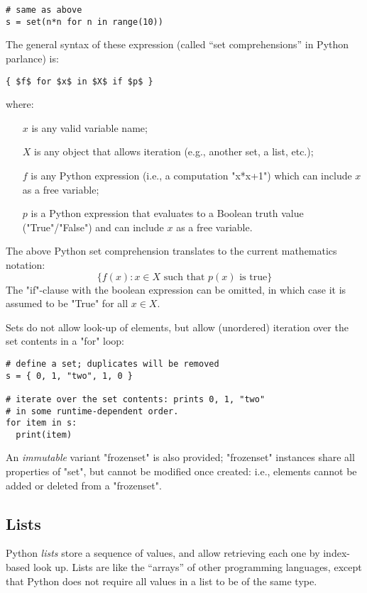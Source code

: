 {\begin{lstlisting}
# same as above
s = set(n*n for n in range(10))
\end{lstlisting}
The general syntax of these expression (called ``set comprehensions''
in Python parlance) is:
\begin{lstlisting}
{ $f$ for $x$ in $X$ if $p$ }
\end{lstlisting}
where:
\begin{itemize}
\item[$x$] is any valid variable name;
\item[$X$] is any object that allows iteration (e.g., another
  set, a list, etc.);
\item[$f$] is any Python expression (i.e., a computation "x*x+1") 
  which can include $x$ as a free variable;
\item[$p$] is a Python expression that evaluates to a Boolean truth
  value ("True"/"False") and can include $x$ as a free variable.
\end{itemize}
The above Python set comprehension translates to the current
mathematics notation:
\begin{equation*}
  \{ f(x) : x \in X \text{ such that } p(x) \text{ is true} \}
\end{equation*}
The "if"-clause with the boolean expression can be omitted, in which
case it is assumed to be "True" for all $x \in X$.

Sets do not allow look-up of elements, but allow (unordered) iteration
over the set contents in a "for" loop:
\begin{lstlisting}
# define a set; duplicates will be removed
s = { 0, 1, "two", 1, 0 }

# iterate over the set contents: prints 0, 1, "two" 
# in some runtime-dependent order.
for item in s:
  print(item)
\end{lstlisting}

An \emph{immutable} variant "frozenset" is also provided;
"frozenset" instances share all properties of "set", but cannot be
modified once created: i.e., elements cannot be added or deleted from
a "frozenset".

                                                               
\subsection{Lists}
\label{sec:lists}

Python \emph{lists} store a sequence of values, and allow retrieving
each one by index-based look up.  Lists are like the ``arrays'' of
other programming languages, except that Python does not require all
values in a list to be of the same type.

}
